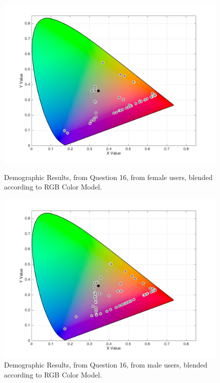 \begin{figure}[!htbp]
  \centering
  \begin{minipage}{0.48\textwidth}
    \centering
    \includegraphics[width=\textwidth]{images/results/16_demo_genderF_RGBresponses.png}
    \caption[Demographic Results, Question 16, Female users, according to RGB.]{Demographic Results, from Question 16, from female users, blended according to RGB Color Model.}
    \label{fig:gender_1}
  \end{minipage}\hfill
  \begin{minipage}{0.48\textwidth}
    \centering
    \includegraphics[width=\textwidth]{images/results/16_demo_genderM_RGBresponses.png}
    \caption[Demographic Results, Question 16, Male users, according to RGB.]{Demographic Results, from Question 16, from male users, blended according to RGB Color Model.}
    \label{fig:gender_2}
  \end{minipage}
\end{figure}
%
